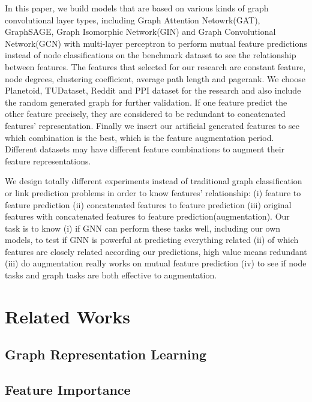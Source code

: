 \documentclass[sigconf]{acmart}
\begin{document}
In this paper, we build models that are based on various kinds of graph convolutional layer types, including Graph Attention Netowrk(GAT), GraphSAGE, Graph Isomorphic Network(GIN) and Graph Convolutional Network(GCN) with multi-layer perceptron to perform mutual feature predictions instead of node classifications on the benchmark dataset to see the relationship between features. The features that selected for our research are  constant feature, node degrees, clustering coefficient, average path length and pagerank. We choose Planetoid, TUDataset, Reddit and PPI dataset for the research and also include the random generated graph for further validation. If one feature predict the other feature precisely, they are considered to be redundant to concatenated features' representation.  Finally we insert our artificial generated features to see which combination is the best, which is the feature augmentation period. Different datasets may have different feature combinations to augment their feature representations.   



We design totally different experiments instead of traditional graph classification or link prediction problems in order to know features' relationship: (i) feature to feature prediction (ii) concatenated features to feature prediction (iii) original features with concatenated features to feature prediction(augmentation). Our task is to know (i) if GNN can perform these tasks well, including our own models, to test if GNN is powerful at predicting everything related (ii) of which features are closely related according our predictions, high value means redundant (iii) do augmentation really works on mutual feature prediction (iv) to see if node tasks and graph tasks are both effective to augmentation.

\section{Related Works}



\subsection{Graph Representation Learning}

\subsection{Feature Importance}
\end{document}
